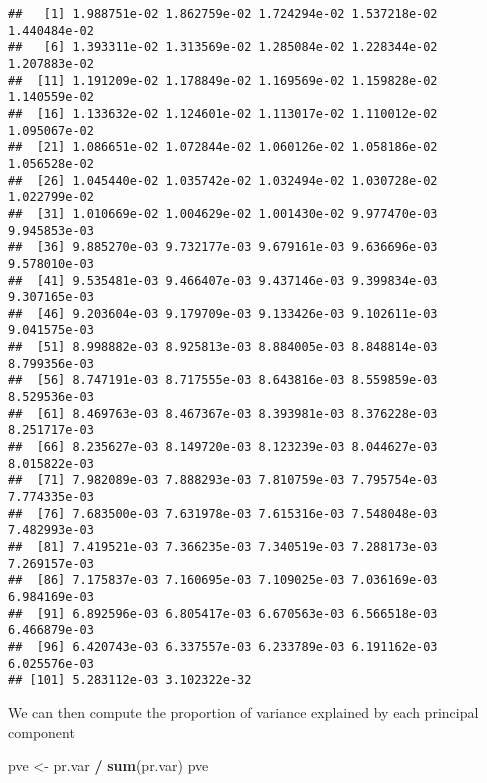 \documentclass[
]{article}
\newenvironment{Shaded}{\begin{snugshade}}{\end{snugshade}}
\newcommand{\FunctionTok}[1]{\textcolor[rgb]{0.13,0.29,0.53}{\textbf{#1}}}
\newcommand{\NormalTok}[1]{#1}
\newcommand{\OtherTok}[1]{\textcolor[rgb]{0.56,0.35,0.01}{#1}}
\newcommand{\SpecialCharTok}[1]{\textcolor[rgb]{0.81,0.36,0.00}{\textbf{#1}}}
\begin{document}
\begin{verbatim}
##   [1] 1.988751e-02 1.862759e-02 1.724294e-02 1.537218e-02 1.440484e-02
##   [6] 1.393311e-02 1.313569e-02 1.285084e-02 1.228344e-02 1.207883e-02
##  [11] 1.191209e-02 1.178849e-02 1.169569e-02 1.159828e-02 1.140559e-02
##  [16] 1.133632e-02 1.124601e-02 1.113017e-02 1.110012e-02 1.095067e-02
##  [21] 1.086651e-02 1.072844e-02 1.060126e-02 1.058186e-02 1.056528e-02
##  [26] 1.045440e-02 1.035742e-02 1.032494e-02 1.030728e-02 1.022799e-02
##  [31] 1.010669e-02 1.004629e-02 1.001430e-02 9.977470e-03 9.945853e-03
##  [36] 9.885270e-03 9.732177e-03 9.679161e-03 9.636696e-03 9.578010e-03
##  [41] 9.535481e-03 9.466407e-03 9.437146e-03 9.399834e-03 9.307165e-03
##  [46] 9.203604e-03 9.179709e-03 9.133426e-03 9.102611e-03 9.041575e-03
##  [51] 8.998882e-03 8.925813e-03 8.884005e-03 8.848814e-03 8.799356e-03
##  [56] 8.747191e-03 8.717555e-03 8.643816e-03 8.559859e-03 8.529536e-03
##  [61] 8.469763e-03 8.467367e-03 8.393981e-03 8.376228e-03 8.251717e-03
##  [66] 8.235627e-03 8.149720e-03 8.123239e-03 8.044627e-03 8.015822e-03
##  [71] 7.982089e-03 7.888293e-03 7.810759e-03 7.795754e-03 7.774335e-03
##  [76] 7.683500e-03 7.631978e-03 7.615316e-03 7.548048e-03 7.482993e-03
##  [81] 7.419521e-03 7.366235e-03 7.340519e-03 7.288173e-03 7.269157e-03
##  [86] 7.175837e-03 7.160695e-03 7.109025e-03 7.036169e-03 6.984169e-03
##  [91] 6.892596e-03 6.805417e-03 6.670563e-03 6.566518e-03 6.466879e-03
##  [96] 6.420743e-03 6.337557e-03 6.233789e-03 6.191162e-03 6.025576e-03
## [101] 5.283112e-03 3.102322e-32
\end{verbatim}

We can then compute the proportion of variance explained by each
principal component

\begin{Shaded}
\begin{Highlighting}[]
\NormalTok{pve }\OtherTok{\textless{}{-}}\NormalTok{ pr.var }\SpecialCharTok{/} \FunctionTok{sum}\NormalTok{(pr.var)}
\NormalTok{pve}
\end{Highlighting}
\end{Shaded}
\end{document}
